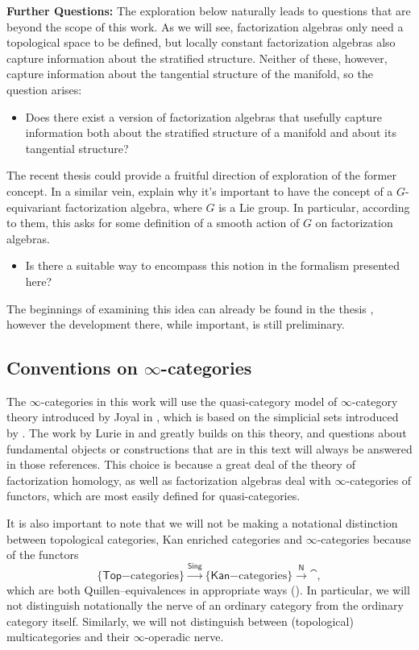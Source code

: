 \documentclass[../text.tex]{subfiles}
\begin{document}
\textbf{Further Questions:} The exploration below naturally leads to questions that are beyond the scope of this work. As we will see, factorization algebras only need a topological space to be defined, but locally constant factorization algebras also capture information about the stratified structure. Neither of these, however, capture information about the tangential structure of the manifold, so the question arises:
%
\begin{itemize}
    \item Does there exist a version of factorization algebras that usefully capture information both about the stratified structure of a manifold and about its tangential structure?
\end{itemize}
%
The recent thesis \cite{pena2022} could provide a fruitful direction of exploration of the former concept. In a similar vein, \cite{cg2016} explain why it's important to have the concept of a $G$-equivariant factorization algebra, where $G$ is a Lie group. In particular, according to them, this asks for some definition of a smooth action of $G$ on factorization algebras.
%
\begin{itemize}
    \item Is there a suitable way to encompass this notion in the formalism presented here?
\end{itemize}
%
The beginnings of examining this idea can already be found in the thesis \cite{murray2020}, however the development there, while important, is still preliminary.



\subsection{Conventions on \texorpdfstring{$\infty$}{infinity}-categories}

The $\infty$-categories in this work will use the quasi-category model of $\infty$-category theory introduced by Joyal in \cite{joyal}, which is based on the simplicial sets introduced by \cite{bv73}. The work by Lurie in \cite{lurie_htt} and \cite{lurie_ha} greatly builds on this theory, and questions about fundamental objects or constructions that are in this text will always be answered in those references. This choice is because a great deal of the theory of factorization homology, as well as factorization algebras deal with $\infty$-categories of functors, which are most easily defined for quasi-categories.

It is also important to note that we will not be making a notational distinction between topological categories, Kan enriched categories and $\infty$-categories because of the functors
%
\begin{equation}
    \{ \mathsf{Top}\mathrm{-categories}\} \xrightarrow{\mathsf{Sing}} \{ \mathsf{Kan}\mathrm{-categories}\} \xrightarrow{\mathsf{N}} \cat,
\end{equation}
%
which are both Quillen--equivalences in appropriate ways (\cite{joyal2007quasi,bergner2010survey}). In particular, we will not distinguish notationally the nerve of an ordinary category from the ordinary category itself. Similarly, we will not distinguish between (topological) multicategories and their $\infty$-operadic nerve.
\end{document}
